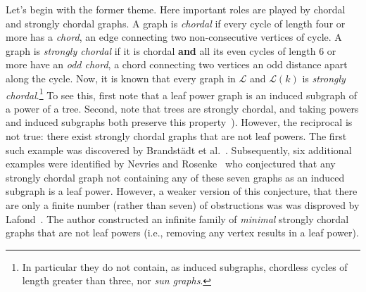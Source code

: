 \documentclass[11pt,letter]{article}
\theoremstyle{remark}
\renewcommand{\L}{\mathcal{L}}
\begin{document}
Let's begin with the former theme. Here  important roles are played by chordal and strongly chordal graphs.
A graph is \emph{chordal} if every cycle of length four or more has a \emph{chord}, an edge connecting two non-consecutive vertices of cycle. A graph is \emph{strongly chordal} if it is chordal {\bf and} all its even cycles of length $6$ or more have an \emph{odd chord}, a chord connecting two vertices an odd distance apart along the cycle.
Now, it is known that every graph in $\L$ and $\L(k)$ is \emph{strongly chordal}.\footnote{In particular they do not contain, as induced subgraphs, chordless cycles of length greater than three, nor {\em sun graphs}.} To see this, first note that a leaf power graph is an induced subgraph of a power of a tree. Second,
note that trees are strongly chordal, and taking powers and induced subgraphs both preserve this property~\cite{raychaudhuri1992powers}).  
However, the reciprocal is not true: there exist strongly chordal graphs that are not leaf powers. The first such example was discovered by Brandst\"adt et al.~\cite{BRANDSTADT2010897}. Subsequently, six additional examples were identified by Nevries and Rosenke~\cite{nevries2016towards} who conjectured that any strongly chordal graph not containing any of these seven graphs as an induced subgraph is a leaf power. 
However, a weaker version of this conjecture, that there are only a finite number (rather than seven) of obstructions was
was disproved by Lafond~\cite{Lafond2017}. The author
constructed an infinite family of \emph{minimal} strongly chordal graphs that are not leaf powers (i.e., removing any vertex results in a leaf power). 
\end{document}
